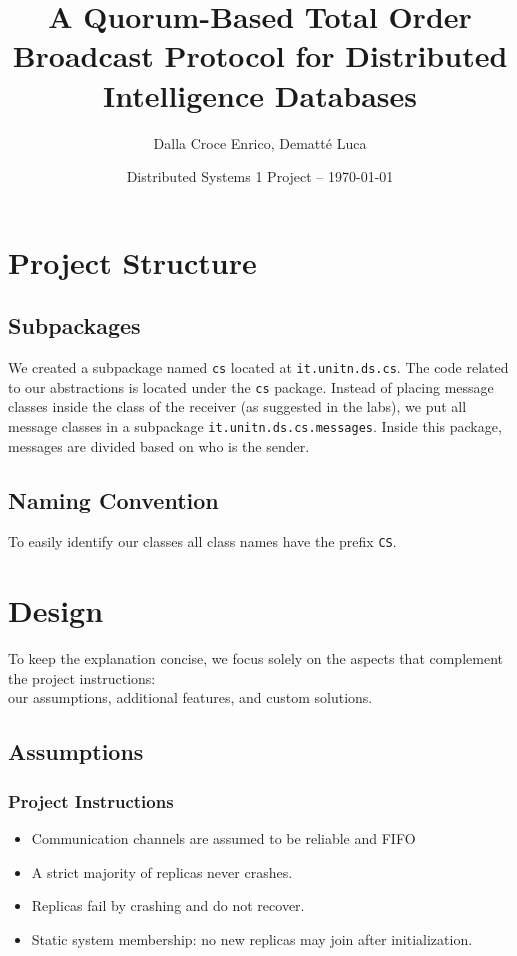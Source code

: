 \documentclass[a4paper]{article}
\title{\vspace{-20mm}A Quorum-Based Total Order Broadcast Protocol for Distributed Intelligence Databases}
\author{Dalla Croce Enrico, Dematté Luca}
\date{Distributed Systems 1 Project -- \today}
\begin{document}
    \maketitle
    \section{Project Structure}
        \subsection{Subpackages}
            We created a subpackage named \texttt{cs} located at \texttt{it.unitn.ds.cs}.
            The code related to our abstractions is located under the \texttt{cs} package.
            Instead of placing message classes inside the class of the receiver (as suggested in the labs), we put all message classes in a subpackage \texttt{it.unitn.ds.cs.messages}.
            Inside this package, messages are divided based on who is the sender.
        \subsection{Naming Convention}
            To easily identify our classes all class names have the prefix \texttt{CS}.
    \section{Design}
        To keep the explanation concise, we focus solely on the aspects that complement the project instructions:\\
        our assumptions, additional features, and custom solutions.
        \subsection{Assumptions}
            \subsubsection{Project Instructions}
                \begin{itemize}
                    \item Communication channels are assumed to be reliable and FIFO
                    \item A strict majority of replicas never crashes.
                    \item Replicas fail by crashing and do not recover.
                    \item Static system membership: no new replicas may join after initialization.
                \end{itemize}
\end{document}
